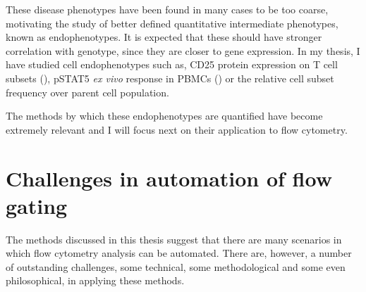 These disease phenotypes have been found in many cases to be too coarse, motivating the study of better defined quantitative intermediate phenotypes, known as endophenotypes.
It is expected that these should have stronger correlation with genotype, since they are closer to gene expression.
In my thesis, I have studied cell endophenotypes such as, CD25 protein expression on T cell subsets (), pSTAT5 \textit{ex vivo} response in \glspl{PBMC} () or the relative cell subset frequency over parent cell population.

The methods by which these endophenotypes are quantified have become extremely relevant and I will focus next on their application to flow cytometry.



\section{ Challenges in automation of flow gating }

The methods discussed in this thesis suggest that there are many scenarios in which flow cytometry analysis can be automated.
There are, however, a number of outstanding challenges, some technical, some methodological and some even philosophical, in applying these methods.


